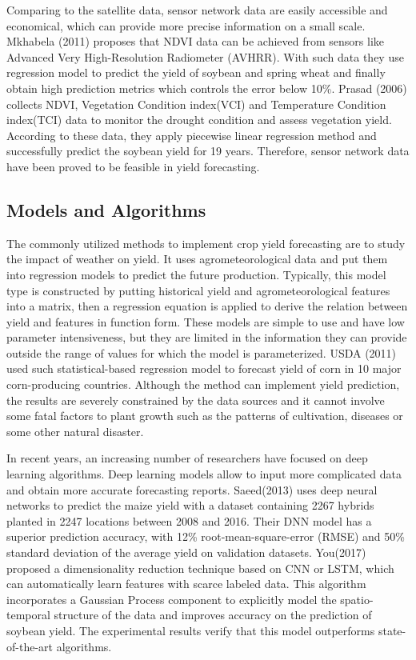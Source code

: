 \documentclass[conference]{IEEEtran}
\begin{document}
    Comparing to the satellite data, sensor network data are easily accessible and economical, which can provide more precise information on a small scale. Mkhabela (2011)\cite{Mkhabela2011} proposes that NDVI data can be achieved from sensors like Advanced Very High-Resolution Radiometer (AVHRR). With such data they use regression model to predict the yield of soybean and spring wheat and finally obtain high prediction metrics which controls the error below 10\%. Prasad (2006) \cite{Prasad2006} collects NDVI, Vegetation Condition index(VCI) and Temperature Condition index(TCI) data to monitor the drought condition and assess vegetation yield. According to these data, they apply piecewise linear regression method and successfully predict the soybean yield for 19 years. Therefore, sensor network data have been proved to be feasible in yield forecasting.

  \subsection{Models and Algorithms}

    The commonly utilized methods to implement crop yield forecasting are to study the impact of weather on yield. It uses agrometeorological data and put them into regression models to predict the future production. Typically, this model type is constructed by putting historical yield and agrometeorological features into a matrix, then a regression equation is applied to derive the relation between yield and features in function form. These models are simple to use and have low parameter intensiveness, but they are limited in the information they can provide outside the range of values for which the model is parameterized. USDA (2011)\cite{good2011usda} used such statistical-based regression model to forecast yield of corn in 10 major corn-producing countries. Although the method can implement yield prediction, the results are severely constrained by the data sources and it cannot involve some fatal factors to plant growth such as the patterns of cultivation, diseases or some other natural disaster.  

    In recent years, an increasing number of researchers have focused on deep learning algorithms. Deep learning models allow to input more complicated data and obtain more accurate forecasting reports. Saeed(2013)\cite{Basso2013} uses deep neural networks to predict the maize yield with a dataset containing 2267 hybrids planted in 2247 locations between 2008 and 2016. Their DNN model has a superior prediction accuracy, with 12\% root-mean-square-error (RMSE) and 50\% standard deviation of the average yield on validation datasets. You(2017)\cite{You2017} proposed a dimensionality reduction technique based on CNN or LSTM, which can automatically learn features with scarce labeled data. This algorithm incorporates a Gaussian Process component to explicitly model the spatio-temporal structure of the data and improves accuracy on the prediction of soybean yield. The experimental results verify that this model outperforms state-of-the-art algorithms.
\end{document}
